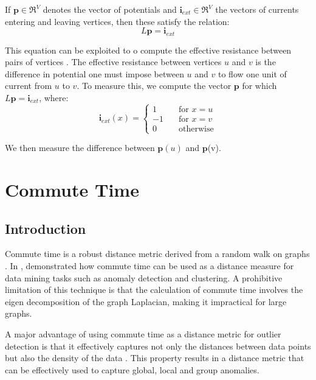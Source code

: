 If $\textbf{p} \in \Re^{V}$ denotes the vector of potentials and 
$\textbf{i}_{ext} \in \Re^{V}$ the vectors of currents entering and leaving 
vertices, then these satisfy the relation:
\begin{equation}
L\textbf{p} = \textbf{i}_{ext}
\end{equation}

This equation can be exploited to o compute the effective resistance between 
pairs of vertices \cite{Spielman:2010}. The effective resistance between 
vertices $u$ and $v$ is the difference in potential one must impose between $u$ 
and $v$ to flow one unit of current from $u$ to $v$. To measure this, we compute
the vector $\textbf{p}$ for which $L\textbf{p} = \textbf{i}_{ext}$, where:
\begin{equation}
\textbf{i}_{ext}(x) =
	\left\{
        \begin{array}{ll}
            1 &   	\quad \text{for $x=u$} \\
            -1 & 	\quad \text{for $x=v$} \\
            0 &		\quad \text{otherwise}
        \end{array}
    \right.
\end{equation}

We then measure the difference between $\textbf{p}(u)$ and $\textbf{p}$(v).

\section{Commute Time}
\label{sec:commuteTime}

\subsection{Introduction}
\label{sec:commuteTimeIntroduction}
Commute time is a robust distance metric derived from a random walk on graphs 
\cite{Khoa:2012}. In , \citeauthor{Khoa:2012} demonstrated 
how commute time can be used as a distance measure for data mining tasks such as
anomaly detection and clustering. A prohibitive limitation of this technique is 
that the calculation of commute time involves the eigen decomposition of the 
graph Laplacian, making it impractical for large graphs.

A major advantage of using commute time as a distance metric for outlier 
detection is that it effectively captures not only the distances between data 
points but also the density of the data \citeneeded{}. This property results in 
a distance metric that can be effectively used to capture global, local and 
group anomalies.

